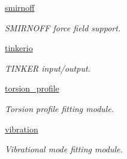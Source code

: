 \begin{DoxyCompactItemize}
 \hyperlink{namespaceforcebalance_1_1smirnoff}{smirnoff}
\begin{DoxyCompactList}\small\item\em S\+M\+I\+R\+N\+O\+FF force field support. \end{DoxyCompactList}\item 
 \hyperlink{namespaceforcebalance_1_1tinkerio}{tinkerio}
\begin{DoxyCompactList}\small\item\em T\+I\+N\+K\+ER input/output. \end{DoxyCompactList}\item 
 \hyperlink{namespaceforcebalance_1_1torsion__profile}{torsion\+\_\+profile}
\begin{DoxyCompactList}\small\item\em Torsion profile fitting module. \end{DoxyCompactList}\item 
 \hyperlink{namespaceforcebalance_1_1vibration}{vibration}
\begin{DoxyCompactList}\small\item\em Vibrational mode fitting module. \end{DoxyCompactList}\end{DoxyCompactItemize}
